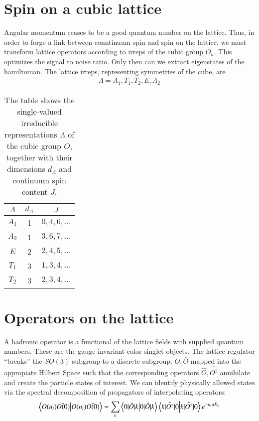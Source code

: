 \section{Spin on a cubic lattice}
Angular momentum ceases to be a good quantum number on the lattice. Thus, in order to forge a link between conntinuum spin and spin on the lattice, we must transform lattice operators according to irreps of the cubic group $O_h$. This optimizes the signal to noise ratio. Only then can we extract eigenstates of the hamiltonian. The lattice irreps, representing symmetries of the cube, are
\begin{align}
    \Lambda = {A_1,T_1,T_2,E,A_2}
\end{align}
\begin{table}
    \begin{tabular}{ccc}
    $\Lambda$ & $d_{\Lambda}$ & $J$\\ \hline
    $A_1$ & 1 & $0,4,6,\dots$\\
    $A_2$ & 1 & $3,6,7,\dots$\\
    $E$ & 2 & $2,4,5,\dots$\\
    $T_1$ & 3 & $1,3,4,\dots$\\
    $T_2$ & 3 & $2,3,4,\dots$\\ \hline
    \end{tabular}
    \caption{The table shows the single-valued irreducible representations
      $\Lambda$ of the cubic group $O$, together with their dimensions
      $d_\Lambda$ and continuum spin content $J$\protect.\label{tab:irrep}}
    \end{table}

\section{Operators on the lattice}
A hadronic operator is a functional of the lattice fields with supplied quantum numbers. These are the gauge-invariant color singlet objects. The lattice regulator ``breaks'' the $SO(3)$ subgroup to a discrete subgroup. $O,\bar{O}$ mapped into the appropiate Hilbert Space such that the corresponding operators $\hat{O} ,\hat{O^\dagger}$  annihilate and create the particle states of interest. We can identify physically allowed states via the spectral decomposition of propagators of interpolating operators: 
\begin{equation}
\braket{O(n_t)\bar{O(0)}} = \sum_{n}\braket{0|\hat{O}|k} \braket{k|\hat{O^{\dagger}}|0} e^{-n_taE_k}
\end{equation}

